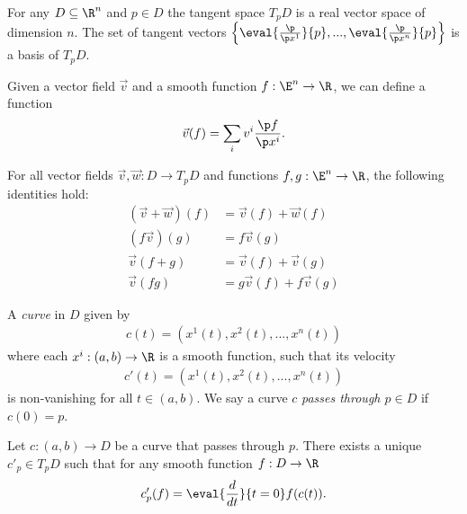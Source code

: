 \documentclass{article}
\begin{document}
\begin{theorem}[Notes 4.4]
    For any $D\subseteq \R^n$ and $p\in D$ the tangent space $T_pD$ is a real vector space
    of dimension $n$. The set of tangent vectors 
    $\left\lbrace\eval{\frac{\p }{\p x^1}}{p}, ...,\eval{\frac{\p }{\p x^n}}{p}\right\rbrace$
    is a basis of $T_pD$.
\end{theorem}

\begin{definition}
    Given a vector field $\vec v$ and a smooth function $f:\E^n\to\R$, we can define a function 
    \begin{align*}
        \vec v(f) = \sum_i v^i\frac{\p f}{\p x^i}.
    \end{align*}
\end{definition}

\begin{proposition}[Notes 4.7]
    For all vector fields $\vec v,\vec w:D\to T_pD$ and functions $f,g:\E^n\to\R$, the following identities hold:
    \begin{align*}
        (\vec v+\vec w)(f) &= \vec v(f) + \vec w(f)\\
        (f\vec v)(g)  &= f\vec v(g) \\
        \vec v(f+g)   &= \vec v(f) + \vec v(g) \\
        \vec v(fg)    &= g\vec v(f) + f\vec v(g)
    \end{align*}
\end{proposition}

\begin{definition}
    A \emph{curve} in $D$ given by
    \begin{align*}
        c(t) = (x^1(t), x^2(t), ..., x^n(t))
    \end{align*}
    where each $x^i:(a,b)\to\R$ is a smooth function, such that its velocity
    \begin{align*}
        c'(t)=(x^1(t), x^2(t), ..., x^n(t))
    \end{align*}
    is non-vanishing for all $t\in(a,b)$. 
    We say a curve $c$ \emph{passes through $p\in D$} if $c(0)=p$.
\end{definition}

\begin{proposition}[Notes 4.9]
    Let $c:(a,b)\to D$ be a curve that passes through $p$. There exists a unique
    $c'_p\in T_p D$ such that for any smooth function $f:D\to\R$
    \begin{align*}
        c'_p(f) = \eval{\frac{d}{dt}}{t=0} f(c(t)).
    \end{align*}
\end{proposition}
\end{document}
